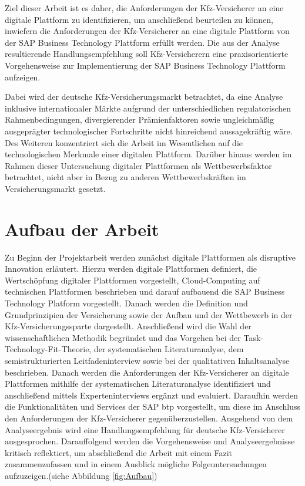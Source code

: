 Ziel dieser Arbeit ist es daher, die Anforderungen der Kfz-Versicherer an eine digitale Plattform zu identifizieren, um anschließend beurteilen zu können, inwiefern die Anforderungen der Kfz-Versicherer an eine digitale Plattform von der SAP Business Technology Plattform erfüllt werden. Die aus der Analyse resultierende Handlungsempfehlung soll Kfz-Versicherern eine praxisorientierte Vorgehensweise zur Implementierung der SAP Business Technology Plattform aufzeigen.

Dabei wird der deutsche Kfz-Versicherungsmarkt betrachtet, da eine Analyse inklusive internationaler Märkte aufgrund der unterschiedlichen regulatorischen Rahmenbedingungen, divergierender Prämienfaktoren sowie ungleichmäßig ausgeprägter technologischer Fortschritte nicht hinreichend aussagekräftig wäre. Des Weiteren konzentriert sich die Arbeit im Wesentlichen auf die technologischen Merkmale einer digitalen Plattform. Darüber hinaus werden im Rahmen dieser Untersuchung digitaler Plattformen als Wettbewerbsfaktor betrachtet, nicht aber in Bezug zu anderen Wettbewerbskräften im Versicherungsmarkt gesetzt.



\newpage
\section{Aufbau der Arbeit}

Zu Beginn der Projektarbeit werden zunächst digitale Plattformen als disruptive Innovation erläutert. Hierzu werden digitale Plattformen definiert, die Wertschöpfung digitaler Plattformen vorgestellt, Cloud-Computing auf technischen Plattformen beschrieben und darauf aufbauend die SAP Business Technology Platform vorgestellt. Danach werden die Definition und Grundprinzipien der Versicherung sowie der Aufbau und der Wettbewerb in der Kfz-Versicherungssparte dargestellt. Anschließend wird die Wahl der wissenschaftlichen Methodik begründet und das Vorgehen bei der Task-Technology-Fit-Theorie, der systematischen Literaturanalyse, dem semistrukturierten Leitfadeninterview sowie bei der qualitativen Inhaltsanalyse beschrieben. Danach werden die Anforderungen der Kfz-Versicherer an digitale Plattformen mithilfe der systematischen Literaturanalyse identifiziert und anschließend mittels Experteninterviews ergänzt und evaluiert. Daraufhin werden die Funktionalitäten und Services der SAP \ac{btp} vorgestellt, um diese im Anschluss den Anforderungen der Kfz-Versicherer gegenüberzustellen. Ausgehend von dem Analyseergebnis wird eine Handlungsempfehlung für deutsche Kfz-Versicherer ausgesprochen. Darauffolgend werden die Vorgehensweise und Analyseergebnisse kritisch reflektiert, um abschließend die Arbeit mit einem Fazit zusammenzufassen und in einem Ausblick mögliche Folgeuntersuchungen aufzuzeigen.(siehe Abbildung \ref{fig:Aufbau})



